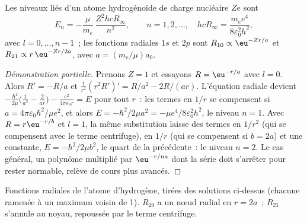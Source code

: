 \begin{theorem}\label{thm:b3:quantum-model-systems:hydrogen}
Les niveaux liés d'un atome hydrogénoïde de charge nucléaire $Ze$ sont
\[
E_n = -\frac{\mu}{m_e}\,\frac{Z^2hcR_\infty}{n^2}, \qquad n = 1, 2, \dots,
\quad hcR_\infty = \frac{m_ee^4}{8\varepsilon_0^2h^2},
\]
avec $l = 0, \dots, n - 1$~; les fonctions radiales $1s$ et $2p$ sont $R_{10}
\propto \eu^{-Zr/a}$ et $R_{21} \propto r\,\eu^{-Zr/2a}$, avec $a =
(m_e/\mu)a_0$.
\end{theorem}

\begin{proof}[Démonstration partielle]
Prenons $Z = 1$ et essayons $R = \eu^{-r/a}$ avec $l = 0$. Alors $R' = -R/a$ et
$\frac{1}{r^2}(r^2R')' = R/a^2 - 2R/(ar)$. L'équation radiale devient
$-\frac{\hbar^2}{2\mu}\big(\frac{1}{a^2} - \frac{2}{ar}\big) - \frac{e^2}{4\pi
\varepsilon_0r} = E$ pour tout $r$~: les termes en $1/r$ se compensent si $a =
4\pi\varepsilon_0\hbar^2/\mu e^2$, et alors $E = -\hbar^2/2\mu a^2 = -\mu
e^4/8\varepsilon_0^2h^2$, le niveau $n = 1$. Avec $R = r\eu^{-r/b}$ et
$l = 1$, la même substitution laisse des termes en $1/r^2$ (qui se
compensent avec le terme centrifuge), en $1/r$ (qui se compensent si
$b = 2a$) et une constante, $E =
-\hbar^2/2\mu b^2$, le quart de la précédente~: le niveau $n = 2$. Le cas
général, un polynôme multiplié par $\eu^{-r/na}$ dont la série doit
s'arrêter pour rester normable, relève de cours plus avancés.
\end{proof}

\begin{omfigure}

{\small Fonctions radiales de l'atome d'hydrogène, tirées des solutions
ci-dessus (chacune ramenée à un maximum voisin de 1). $R_{20}$ a un nœud
radial en $r = 2a$~; $R_{21}$ s'annule au noyau, repoussée par le terme
centrifuge.}
\end{omfigure}


